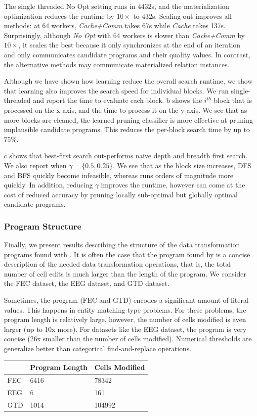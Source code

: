 The single threaded No Opt setting runs in $4432$s, and the materialization optimization reduces the runtime by $10\times$ to $432$s.   Scaling out improves all methods: at 64 workers, {\it Cache+Comm} takes 67s while {\it Cache} takes 137s.  Surprisingly, although {\it No Opt} with 64 workers is slower than {\it Cache+Comm} by $10\times$, it scales the best because it only synchronizes at the end of an iteration and only communicates candidate programs and their quality values.  In contrast, the alternative methods may communicate materialized relation instances.  

 Although we have shown how learning reduce the overall search runtime, we show that learning also improves the search speed for individual blocks.  We run single-threaded \sys and report the time to evaluate each block.  b shows the $i^{th}$ block that is processed on the x-axis, and the time to process it on the y-axis.   We see that as more blocks are cleaned, the learned pruning classifier is more effective at pruning implausible candidate programs.  This reduces the per-block search time by up to $75\%$.  

 c shows that best-first search out-performs naive depth and breadth first search.  We also report \sys when $\gamma=\{0.5, 0.25\}$.  We see that as the block size increases, DFS and BFS quickly become infeasible, whereas \sys runs orders of magnitude more quickly.  In addition, reducing $\gamma$ improves the runtime, however can come at the cost of reduced accuracy by pruning locally sub-optimal but globally optimal candidate programs.  



\subsubsection{Program Structure}
Finally, we present results describing the structure of the data transformation programs found with \sys.
It is often the case that the program found by \sys is a concise description of the needed data transformation operations, that is, the total number of cell edits is much larger than the length of the program.
We consider the FEC dataset, the EEG dataset, and GTD dataset.

Sometimes, the program (FEC and GTD) encodes a significant amount of literal values. This happens in entity matching type problems. For these problems, the program length is relatively large, however, the number of cells modified is even larger (up to 10x more).
For datasets like the EEG dataset, the program is very concise (26x smaller than the number of cells modified).
Numerical thresholds are generalize better than categorical find-and-replace operations.

\begin{table}[ht!]
\centering
\label{my-label}
\begin{tabular}{|l|l|l|}
\hline
    & Program Length & Cells Modified \\ \hline \hline
FEC & 6416           & 78342          \\ \hline
EEG & 6              & 161            \\ \hline
GTD & 1014           & 104992 \\ \hline
\end{tabular}
\end{table}

